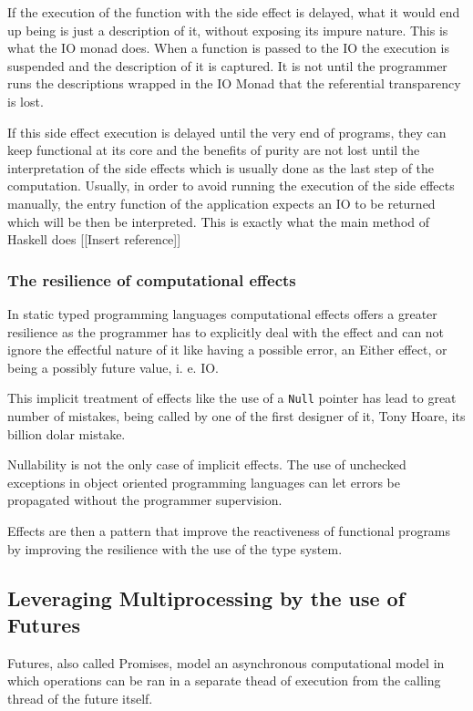 \documentclass[../main.tex]{subfiles}
\begin{document}
If the execution of the function with the side effect is delayed, what it
would end up being is just a description of it, without exposing its impure
nature. This is what the IO monad does. When a function is passed to the IO
the execution is suspended and the description of it is captured. It is not
until the programmer runs the descriptions wrapped in the IO Monad that the
referential transparency is lost.

If this side effect execution is delayed until the very end of programs, they
can keep functional at its core and the benefits of purity are not lost until
the interpretation of the side effects which is usually done as the last step of
the computation. Usually, in order to avoid running the execution of the side
effects manually, the entry function of the application expects an IO to be
returned which will be then be interpreted. This is exactly what the main method
of Haskell does [[Insert reference]]

\subsubsection{The resilience of computational effects}
In static typed programming languages computational effects offers a greater resilience as the
programmer has to explicitly deal with the effect and can not ignore the
effectful nature of it like having a possible error, an Either effect, or being a possibly
future value, i. e. IO.

This implicit treatment of effects like the use of a \texttt{Null} pointer has
lead to great number of mistakes, being called by one of the first designer of
it, Tony Hoare, its billion dolar mistake.

Nullability is not the only case of implicit effects. The use of unchecked
exceptions in object oriented programming languages can let errors be propagated
without the programmer supervision.

Effects are then a pattern that improve the reactiveness of functional programs by
improving the resilience with the use of the type system.

\subsection{Leveraging Multiprocessing by the use of Futures}
Futures, also called Promises, model an asynchronous computational model in
which operations can be ran in a separate thead of execution from the calling
thread of the future itself.
\end{document}
